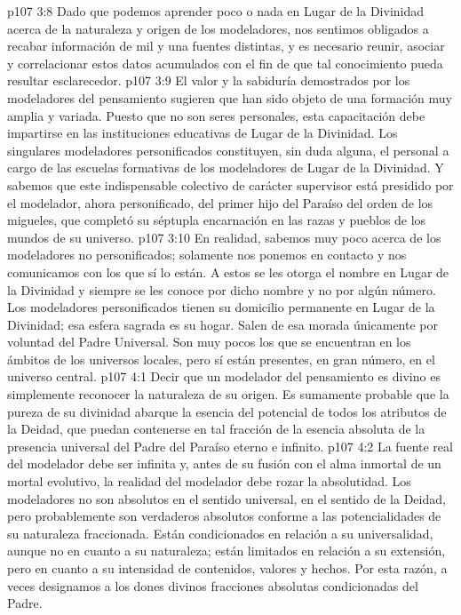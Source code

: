\vs p107 3:8 Dado que podemos aprender poco o nada en Lugar de la Divinidad acerca de la naturaleza y origen de los modeladores, nos sentimos obligados a recabar información de mil y una fuentes distintas, y es necesario reunir, asociar y correlacionar estos datos acumulados con el fin de que tal conocimiento pueda resultar esclarecedor.
\vs p107 3:9 El valor y la sabiduría demostrados por los modeladores del pensamiento sugieren que han sido objeto de una formación muy amplia y variada. Puesto que no son seres personales, esta capacitación debe impartirse en las instituciones educativas de Lugar de la Divinidad. Los singulares modeladores personificados constituyen, sin duda alguna, el personal a cargo de las escuelas formativas de los modeladores de Lugar de la Divinidad. Y sabemos que este indispensable colectivo de carácter supervisor está presidido por el modelador, ahora personificado, del primer hijo del Paraíso del orden de los migueles, que completó su séptupla encarnación en las razas y pueblos de los mundos de su universo.
\vs p107 3:10 En realidad, sabemos muy poco acerca de los modeladores no personificados; solamente nos ponemos en contacto y nos comunicamos con los que sí lo están. A estos se les otorga el nombre en Lugar de la Divinidad y siempre se les conoce por dicho nombre y no por algún número. Los modeladores personificados tienen su domicilio permanente en Lugar de la Divinidad; esa esfera sagrada es su hogar. Salen de esa morada únicamente por voluntad del Padre Universal. Son muy pocos los que se encuentran en los ámbitos de los universos locales, pero sí están presentes, en gran número, en el universo central.
\vs p107 4:1 Decir que un modelador del pensamiento es divino es simplemente reconocer la naturaleza de su origen. Es sumamente probable que la pureza de su divinidad abarque la esencia del potencial de todos los atributos de la Deidad, que puedan contenerse en tal fracción de la esencia absoluta de la presencia universal del Padre del Paraíso eterno e infinito.
\vs p107 4:2 La fuente real del modelador debe ser infinita y, antes de su fusión con el alma inmortal de un mortal evolutivo, la realidad del modelador debe rozar la absolutidad. Los modeladores no son absolutos en el sentido universal, en el sentido de la Deidad, pero probablemente son verdaderos absolutos conforme a las potencialidades de su naturaleza fraccionada. Están condicionados en relación a su universalidad, aunque no en cuanto a su naturaleza; están limitados en relación a su extensión, pero  en cuanto a su intensidad de contenidos, valores y hechos. Por esta razón, a veces designamos a los dones divinos fracciones absolutas condicionadas del Padre.

